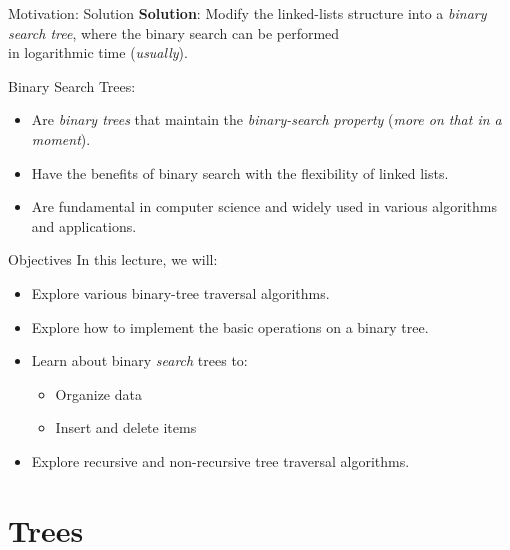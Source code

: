 \documentclass[14pt,aspectratio=1610]{beamer}
\begin{document}
\begin{frame}{Motivation: Solution}
  \textbf{Solution}: Modify the linked-lists structure into a \emph{binary\\
  search tree}, where the binary search can be performed \\
  in logarithmic time (\textit{usually}).

  \pause%
  Binary Search Trees:
  \begin{itemize}
    \item Are \emph{binary trees} that maintain the \emph{binary-search property} (\textit{more on that in a moment}).
    \item Have the benefits of binary search with the flexibility of linked lists.
    \item Are fundamental in computer science and widely used in various algorithms and applications.
  \end{itemize}
\end{frame}

\begin{frame}{Objectives}
In this lecture, we will:

\begin{itemize}
\item
  Explore various binary-tree traversal algorithms.
\item
  Explore how to implement the basic operations on a binary tree.
\item
  Learn about binary \textit{search} trees to:
  \begin{itemize}
    \item
      Organize data
    \item
      Insert and delete items
  \end{itemize}
\item
  Explore recursive and non-recursive tree traversal algorithms.

\end{itemize}
\end{frame}

\section{Trees}
\end{document}

